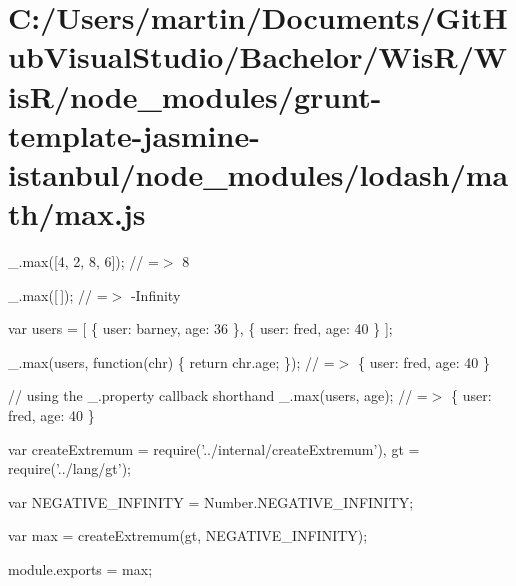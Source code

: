 \hypertarget{_c_1_2_users_2martin_2_documents_2_git_hub_visual_studio_2_bachelor_2_wis_r_2_wis_r_2node_module67eb41ec72958110dc86cec2c4e9728c}{}\section{C\+:/\+Users/martin/\+Documents/\+Git\+Hub\+Visual\+Studio/\+Bachelor/\+Wis\+R/\+Wis\+R/node\+\_\+modules/grunt-\/template-\/jasmine-\/istanbul/node\+\_\+modules/lodash/math/max.\+js}
\+\_\+.\+max(\mbox{[}4, 2, 8, 6\mbox{]}); // =$>$ 8

\+\_\+.\+max(\mbox{[}$\,$\mbox{]}); // =$>$ -\/\+Infinity

var users = \mbox{[} \{ \textquotesingle{}user\textquotesingle{}\+: \textquotesingle{}barney\textquotesingle{}, \textquotesingle{}age\textquotesingle{}\+: 36 \}, \{ \textquotesingle{}user\textquotesingle{}\+: \textquotesingle{}fred\textquotesingle{}, \textquotesingle{}age\textquotesingle{}\+: 40 \} \mbox{]};

\+\_\+.\+max(users, function(chr) \{ return chr.\+age; \}); // =$>$ \{ \textquotesingle{}user\textquotesingle{}\+: \textquotesingle{}fred\textquotesingle{}, \textquotesingle{}age\textquotesingle{}\+: 40 \}

// using the {\ttfamily \+\_\+.\+property} callback shorthand \+\_\+.\+max(users, \textquotesingle{}age\textquotesingle{}); // =$>$ \{ \textquotesingle{}user\textquotesingle{}\+: \textquotesingle{}fred\textquotesingle{}, \textquotesingle{}age\textquotesingle{}\+: 40 \}


\begin{DoxyCodeInclude}
var createExtremum = require(\textcolor{stringliteral}{'../internal/createExtremum'}),
    gt = require(\textcolor{stringliteral}{'../lang/gt'});

var NEGATIVE\_INFINITY = Number.NEGATIVE\_INFINITY;

var max = createExtremum(gt, NEGATIVE\_INFINITY);

module.exports = max;
\end{DoxyCodeInclude}
 
